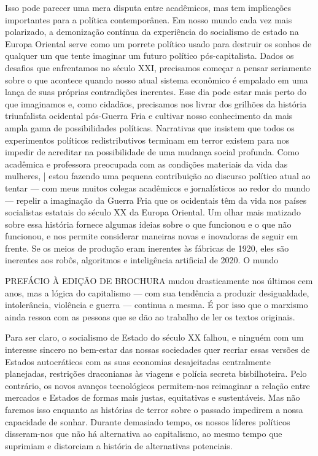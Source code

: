 Isso pode parecer uma mera disputa entre acadêmicos, mas tem implicações importantes para a política contemporânea. Em nosso mundo cada vez mais polarizado, a demonização contínua da experiência do socialismo de estado na Europa Oriental serve como um porrete político usado para destruir os sonhos de qualquer um que tente imaginar um futuro político pós-capitalista. Dados os desafios que enfrentamos no século XXI, precisamos começar a pensar seriamente sobre o que acontece quando nosso atual sistema econômico é empalado em uma lança de suas próprias contradições inerentes. Esse dia pode estar mais perto do que imaginamos e, como cidadãos, precisamos nos livrar dos grilhões da história triunfalista ocidental pós-Guerra Fria e cultivar nosso conhecimento da mais ampla gama de possibilidades políticas. Narrativas que insistem que todos os experimentos políticos redistributivos terminam em terror existem para nos impedir de acreditar na possibilidade de uma mudança social profunda. Como acadêmica e professora preocupada com as condições materiais da vida das mulheres, | estou fazendo uma pequena contribuição ao discurso político atual ao tentar — com meus muitos colegas acadêmicos e jornalísticos ao redor do mundo — repelir a imaginação da Guerra Fria que os ocidentais têm da vida nos países socialistas estatais do século XX da Europa Oriental. Um olhar mais matizado sobre essa história fornece algumas ideias sobre o que funcionou e o que não funcionou, e nos permite considerar maneiras novas e inovadoras de seguir em frente. Se os meios de produção eram inerentes às fábricas de 1920, eles são inerentes aos robôs, algoritmos e inteligência artificial de 2020. O mundo
 \par 
PREFÁCIO À EDIÇÃO DE BROCHURA mudou drasticamente nos últimos cem anos, mas a lógica do capitalismo — com sua tendência a produzir desigualdade, intolerância, violência e guerra — continua a mesma. É por isso que o marxismo ainda ressoa com as pessoas que se dão ao trabalho de ler os textos originais.
 \par 
Para ser claro, o socialismo de Estado do século XX falhou, e ninguém com um interesse sincero no bem-estar das nossas sociedades quer recriar essas versões de Estados autocráticos com as suas economias desajeitadas centralmente planejadas, restrições draconianas às viagens e polícia secreta bisbilhoteira. Pelo contrário, os novos avanços tecnológicos permitem-nos reimaginar a relação entre mercados e Estados de formas mais justas, equitativas e sustentáveis. Mas não faremos isso enquanto as histórias de terror sobre o passado impedirem a nossa capacidade de sonhar. Durante demasiado tempo, os nossos líderes políticos disseram-nos que não há alternativa ao capitalismo, ao mesmo tempo que suprimiam e distorciam a história de alternativas potenciais.

